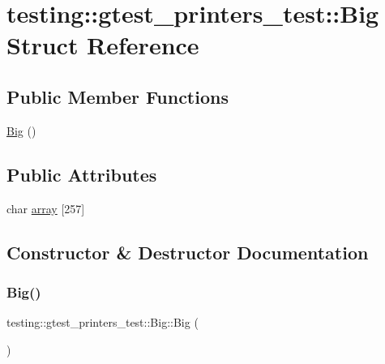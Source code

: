 \hypertarget{structtesting_1_1gtest__printers__test_1_1Big}{}\section{testing\+::gtest\+\_\+printers\+\_\+test\+::Big Struct Reference}
\label{structtesting_1_1gtest__printers__test_1_1Big}
\subsection*{Public Member Functions}
\begin{DoxyCompactItemize}
\item 
\mbox{\hyperlink{structtesting_1_1gtest__printers__test_1_1Big_adb57fb0e14adb81177e3bfd7ed39966c}{Big}} ()
\end{DoxyCompactItemize}
\subsection*{Public Attributes}
\begin{DoxyCompactItemize}
\item 
char \mbox{\hyperlink{structtesting_1_1gtest__printers__test_1_1Big_a863911a8ec5c3bbe79c44d399f1de61f}{array}} \mbox{[}257\mbox{]}
\end{DoxyCompactItemize}


\subsection{Constructor \& Destructor Documentation}
\mbox{\label{structtesting_1_1gtest__printers__test_1_1Big_adb57fb0e14adb81177e3bfd7ed39966c}} 
\subsubsection{\texorpdfstring{Big()}{Big()}}
{\footnotesize\ttfamily testing\+::gtest\+\_\+printers\+\_\+test\+::\+Big\+::\+Big (\begin{DoxyParamCaption}{ }\end{DoxyParamCaption})\hspace{0.3cm}{\ttfamily [inline]}}



